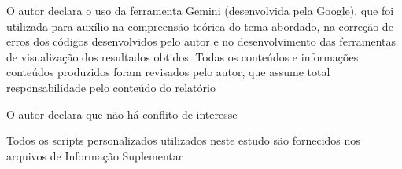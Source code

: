 \documentclass[pdflatex,sn-mathphys-num]{sn-jnl}%
\theoremstyle{thmstyleone}%
\theoremstyle{thmstyletwo}%
\theoremstyle{thmstylethree}%
\begin{document}

O autor declara o uso da ferramenta Gemini (desenvolvida pela Google), que foi utilizada para auxílio na compreensão teórica do tema abordado, na correção de erros dos códigos desenvolvidos pelo autor e no desenvolvimento das ferramentas de visualização dos resultados obtidos. Todas os conteúdos e informações conteúdos produzidos foram revisados pelo autor, que assume total responsabilidade pelo conteúdo do relatório

O autor declara que não há conflito de interesse


Todos os scripts personalizados utilizados neste estudo são fornecidos nos arquivos de Informação Suplementar



\begin{appendices}






\end{appendices}
\end{document}
